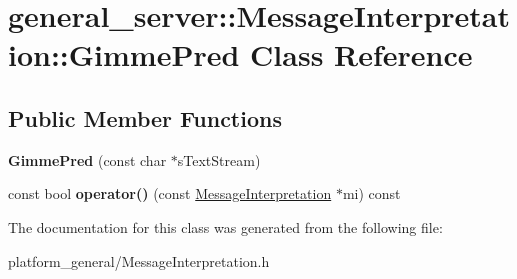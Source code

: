 \hypertarget{classgeneral__server_1_1MessageInterpretation_1_1GimmePred}{\section{general\-\_\-server\-:\-:\-Message\-Interpretation\-:\-:\-Gimme\-Pred \-Class \-Reference}
\label{classgeneral__server_1_1MessageInterpretation_1_1GimmePred}
}
\subsection*{\-Public \-Member \-Functions}
\begin{DoxyCompactItemize}
\item 
\hypertarget{classgeneral__server_1_1MessageInterpretation_1_1GimmePred_ad559e006a9617b560c569e951496393c}{{\bfseries \-Gimme\-Pred} (const char $\ast$s\-Text\-Stream)}\label{classgeneral__server_1_1MessageInterpretation_1_1GimmePred_ad559e006a9617b560c569e951496393c}

\item 
\hypertarget{classgeneral__server_1_1MessageInterpretation_1_1GimmePred_aedbb080e0be96770aef75800b00f307f}{const bool {\bfseries operator()} (const \hyperlink{classgeneral__server_1_1MessageInterpretation}{\-Message\-Interpretation} $\ast$mi) const }\label{classgeneral__server_1_1MessageInterpretation_1_1GimmePred_aedbb080e0be96770aef75800b00f307f}

\end{DoxyCompactItemize}


\-The documentation for this class was generated from the following file\-:\begin{DoxyCompactItemize}
\item 
platform\-\_\-general/\-Message\-Interpretation.\-h\end{DoxyCompactItemize}
